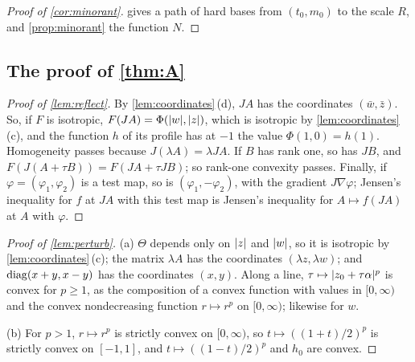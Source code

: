 \begin{proof}[Proof of \cref{cor:minorant}]
 gives a path of hard bases from $(t_0,m_0)$ to the scale $R$, and
\cref{prop:minorant} the function $N$.
\end{proof}

\subsection{The proof of \texorpdfstring{\cref{thm:A}}{Theorem A}}

\begin{proof}[Proof of \cref{lem:reflect}]
By \cref{lem:coordinates}\,(d), $JA$ has the coordinates $(\bar w,\bar z)$. So, if $F$ is
isotropic, $F(JA)=\Phi(\lvert w\rvert,\lvert z\rvert)$, which is isotropic by \cref{lem:coordinates}\,(c), and
the function $h$ of its profile has at $-1$ the value $\Phi(1,0)=h(1)$. Homogeneity passes
because $J(\lambda A)=\lambda JA$. If $B$ has rank one, so has $JB$, and
$F(J(A+\tau B))=F(JA+\tau JB)$; so rank-one convexity passes.
Finally, if $\varphi=(\varphi_1,\varphi_2)$ is a test map, so is $(\varphi_1,-\varphi_2)$, with
the gradient $J\nabla\varphi$; Jensen's inequality for $f$ at $JA$ with this test map is Jensen's
inequality for $A\mapsto f(JA)$ at $A$ with $\varphi$.
\end{proof}

\begin{proof}[Proof of \cref{lem:perturb}]
(a) $\Theta$ depends only on $\lvert z\rvert$ and $\lvert w\rvert$, so it is isotropic by
\cref{lem:coordinates}\,(c); the matrix $\lambda A$ has the coordinates $(\lambda z,\lambda w)$;
and $\operatorname{diag}(x+y,x-y)$ has the coordinates $(x,y)$. Along a line,
$\tau\mapsto\lvert z_0+\tau\alpha\rvert^p$ is convex for $p\ge1$, as the composition of a convex
function with values in $[0,\infty)$ and the convex nondecreasing function $r\mapsto r^p$ on
$[0,\infty)$; likewise for $w$.

(b) For $p>1$, $r\mapsto r^p$ is strictly convex on $[0,\infty)$, so $t\mapsto((1+t)/2)^p$ is
strictly convex on $[-1,1]$, and $t\mapsto((1-t)/2)^p$ and $h_0$ are convex.
\end{proof}

